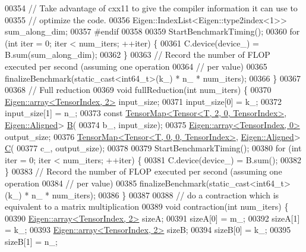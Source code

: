 \begin{DoxyCode}
00354     \textcolor{comment}{// Take advantage of cxx11 to give the compiler information it can use to}
00355     \textcolor{comment}{// optimize the code.}
00356     Eigen::IndexList<Eigen::type2index<1>> sum\_along\_dim;
00357 \textcolor{preprocessor}{#endif}
00358 
00359     StartBenchmarkTiming();
00360     \textcolor{keywordflow}{for} (\textcolor{keywordtype}{int} iter = 0; iter < num\_iters; ++iter) \{
00361       C.device(device\_) = B.sum(sum\_along\_dim);
00362     \}
00363     \textcolor{comment}{// Record the number of FLOP executed per second (assuming one operation}
00364     \textcolor{comment}{// per value)}
00365     finalizeBenchmark(static\_cast<int64\_t>(k\_) * n\_ * num\_iters);
00366   \}
00367 
00368   \textcolor{comment}{// Full reduction}
00369   \textcolor{keywordtype}{void} fullReduction(\textcolor{keywordtype}{int} num\_iters) \{
00370     \hyperlink{class_eigen_1_1array}{Eigen::array<TensorIndex, 2>} input\_size;
00371     input\_size[0] = k\_;
00372     input\_size[1] = n\_;
00373     \textcolor{keyword}{const} \hyperlink{class_eigen_1_1_tensor_map}{TensorMap<Tensor<T, 2, 0, TensorIndex>}, 
      \hyperlink{group__enums_gga45fe06e29902b7a2773de05ba27b47a1ad37d4c71425bb286e9b4103830538fbf}{Eigen::Aligned}> \hyperlink{group___core___module_class_eigen_1_1_matrix}{B}(
00374         b\_, input\_size);
00375     \hyperlink{class_eigen_1_1array}{Eigen::array<TensorIndex, 0>} output\_size;
00376     \hyperlink{class_eigen_1_1_tensor_map}{TensorMap<Tensor<T, 0, 0, TensorIndex>}, 
      \hyperlink{group__enums_gga45fe06e29902b7a2773de05ba27b47a1ad37d4c71425bb286e9b4103830538fbf}{Eigen::Aligned}> \hyperlink{group___core___module}{C}(
00377         c\_, output\_size);
00378 
00379     StartBenchmarkTiming();
00380     \textcolor{keywordflow}{for} (\textcolor{keywordtype}{int} iter = 0; iter < num\_iters; ++iter) \{
00381       C.device(device\_) = B.sum();
00382     \}
00383     \textcolor{comment}{// Record the number of FLOP executed per second (assuming one operation}
00384     \textcolor{comment}{// per value)}
00385     finalizeBenchmark(static\_cast<int64\_t>(k\_) * n\_ * num\_iters);
00386   \}
00387 
00388   \textcolor{comment}{// do a contraction which is equivalent to a matrix multiplication}
00389   \textcolor{keywordtype}{void} contraction(\textcolor{keywordtype}{int} num\_iters) \{
00390     \hyperlink{class_eigen_1_1array}{Eigen::array<TensorIndex, 2>} sizeA;
00391     sizeA[0] = m\_;
00392     sizeA[1] = k\_;
00393     \hyperlink{class_eigen_1_1array}{Eigen::array<TensorIndex, 2>} sizeB;
00394     sizeB[0] = k\_;
00395     sizeB[1] = n\_;

\end{DoxyCode}
